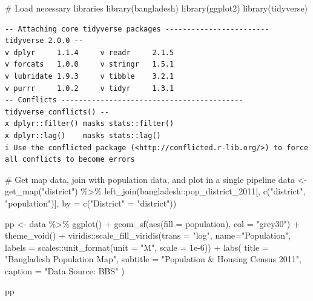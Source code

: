 \documentclass[
  letterpaper,
]{scrbook}
\newenvironment{Shaded}{\begin{snugshade}}{\end{snugshade}}
\newcommand{\AttributeTok}[1]{\textcolor[rgb]{0.40,0.45,0.13}{#1}}
\newcommand{\CommentTok}[1]{\textcolor[rgb]{0.37,0.37,0.37}{#1}}
\newcommand{\FloatTok}[1]{\textcolor[rgb]{0.68,0.00,0.00}{#1}}
\newcommand{\FunctionTok}[1]{\textcolor[rgb]{0.28,0.35,0.67}{#1}}
\newcommand{\NormalTok}[1]{\textcolor[rgb]{0.00,0.23,0.31}{#1}}
\newcommand{\OtherTok}[1]{\textcolor[rgb]{0.00,0.23,0.31}{#1}}
\newcommand{\SpecialCharTok}[1]{\textcolor[rgb]{0.37,0.37,0.37}{#1}}
\newcommand{\StringTok}[1]{\textcolor[rgb]{0.13,0.47,0.30}{#1}}
\begin{document}
\begin{Shaded}
\begin{Highlighting}[]
\CommentTok{\# Load necessary libraries}
\FunctionTok{library}\NormalTok{(bangladesh)}
\FunctionTok{library}\NormalTok{(ggplot2)}
\FunctionTok{library}\NormalTok{(tidyverse)}
\end{Highlighting}
\end{Shaded}

\begin{verbatim}
-- Attaching core tidyverse packages ------------------------ tidyverse 2.0.0 --
v dplyr     1.1.4     v readr     2.1.5
v forcats   1.0.0     v stringr   1.5.1
v lubridate 1.9.3     v tibble    3.2.1
v purrr     1.0.2     v tidyr     1.3.1
-- Conflicts ------------------------------------------ tidyverse_conflicts() --
x dplyr::filter() masks stats::filter()
x dplyr::lag()    masks stats::lag()
i Use the conflicted package (<http://conflicted.r-lib.org/>) to force all conflicts to become errors
\end{verbatim}

\begin{Shaded}
\begin{Highlighting}[]
\CommentTok{\# Get map data, join with population data, and plot in a single pipeline}
\NormalTok{data }\OtherTok{\textless{}{-}} \FunctionTok{get\_map}\NormalTok{(}\StringTok{"district"}\NormalTok{) }\SpecialCharTok{\%\textgreater{}\%}
  \FunctionTok{left\_join}\NormalTok{(bangladesh}\SpecialCharTok{::}\NormalTok{pop\_district\_2011[, }\FunctionTok{c}\NormalTok{(}\StringTok{"district"}\NormalTok{, }\StringTok{"population"}\NormalTok{)], }\AttributeTok{by =} \FunctionTok{c}\NormalTok{(}\StringTok{"District"} \OtherTok{=} \StringTok{"district"}\NormalTok{))}

\NormalTok{pp }\OtherTok{\textless{}{-}}\NormalTok{ data }\SpecialCharTok{\%\textgreater{}\%} 
  \FunctionTok{ggplot}\NormalTok{() }\SpecialCharTok{+}
  \FunctionTok{geom\_sf}\NormalTok{(}\FunctionTok{aes}\NormalTok{(}\AttributeTok{fill =}\NormalTok{ population), }\AttributeTok{col =} \StringTok{"grey30"}\NormalTok{) }\SpecialCharTok{+}
  \FunctionTok{theme\_void}\NormalTok{() }\SpecialCharTok{+}
\NormalTok{  viridis}\SpecialCharTok{::}\FunctionTok{scale\_fill\_viridis}\NormalTok{(}\AttributeTok{trans =} \StringTok{"log"}\NormalTok{, }\AttributeTok{name=}\StringTok{"Population"}\NormalTok{, }\AttributeTok{labels =}\NormalTok{ scales}\SpecialCharTok{::}\FunctionTok{unit\_format}\NormalTok{(}\AttributeTok{unit =} \StringTok{"M"}\NormalTok{, }\AttributeTok{scale =} \FloatTok{1e{-}6}\NormalTok{)) }\SpecialCharTok{+}
  \FunctionTok{labs}\NormalTok{(}
    \AttributeTok{title =} \StringTok{"Bangladesh Population Map"}\NormalTok{,}
    \AttributeTok{subtitle =} \StringTok{"Population \& Housing Census 2011"}\NormalTok{,}
    \AttributeTok{caption =} \StringTok{"Data Source: BBS"}
\NormalTok{  )}

\NormalTok{pp}
\end{Highlighting}
\end{Shaded}
\end{document}
